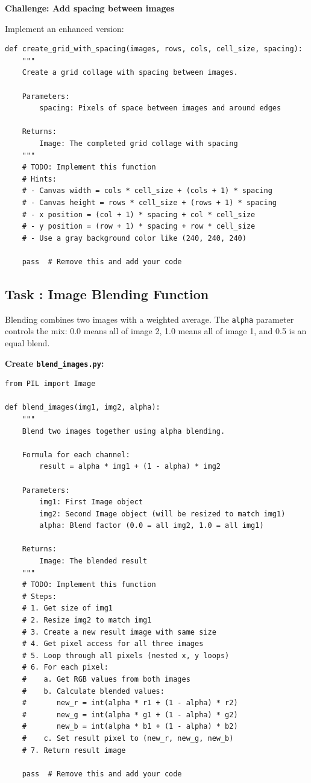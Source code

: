\documentclass[11pt]{article}
\newcounter{taskcounter}
\newcommand{\task}[1]{%
    \stepcounter{taskcounter}%
    \subsection*{Task \thetaskcounter: #1}%
}
\begin{document}
\textbf{Challenge: Add spacing between images}

Implement an enhanced version:

\begin{lstlisting}
def create_grid_with_spacing(images, rows, cols, cell_size, spacing):
    """
    Create a grid collage with spacing between images.

    Parameters:
        spacing: Pixels of space between images and around edges

    Returns:
        Image: The completed grid collage with spacing
    """
    # TODO: Implement this function
    # Hints:
    # - Canvas width = cols * cell_size + (cols + 1) * spacing
    # - Canvas height = rows * cell_size + (rows + 1) * spacing
    # - x position = (col + 1) * spacing + col * cell_size
    # - y position = (row + 1) * spacing + row * cell_size
    # - Use a gray background color like (240, 240, 240)

    pass  # Remove this and add your code
\end{lstlisting}

\task{Image Blending Function}

Blending combines two images with a weighted average. The \texttt{alpha} parameter controls the mix: 0.0 means all of image 2, 1.0 means all of image 1, and 0.5 is an equal blend.

\textbf{Create \texttt{blend\_images.py}:}

\begin{lstlisting}
from PIL import Image

def blend_images(img1, img2, alpha):
    """
    Blend two images together using alpha blending.

    Formula for each channel:
        result = alpha * img1 + (1 - alpha) * img2

    Parameters:
        img1: First Image object
        img2: Second Image object (will be resized to match img1)
        alpha: Blend factor (0.0 = all img2, 1.0 = all img1)

    Returns:
        Image: The blended result
    """
    # TODO: Implement this function
    # Steps:
    # 1. Get size of img1
    # 2. Resize img2 to match img1
    # 3. Create a new result image with same size
    # 4. Get pixel access for all three images
    # 5. Loop through all pixels (nested x, y loops)
    # 6. For each pixel:
    #    a. Get RGB values from both images
    #    b. Calculate blended values:
    #       new_r = int(alpha * r1 + (1 - alpha) * r2)
    #       new_g = int(alpha * g1 + (1 - alpha) * g2)
    #       new_b = int(alpha * b1 + (1 - alpha) * b2)
    #    c. Set result pixel to (new_r, new_g, new_b)
    # 7. Return result image

    pass  # Remove this and add your code
\end{lstlisting}
\end{document}

